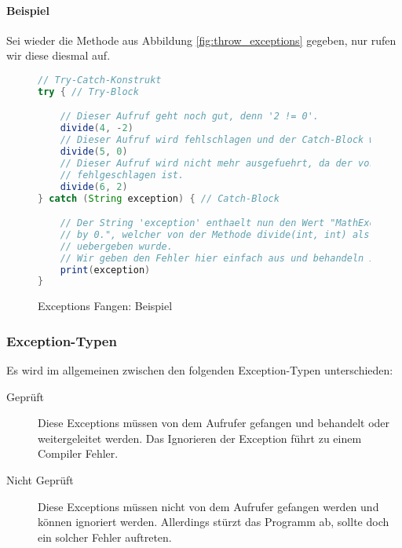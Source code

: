 		\paragraph{Beispiel}
			Sei wieder die Methode aus Abbildung \ref{fig:throw_exceptions} gegeben, nur rufen wir diese diesmal auf.
			\begin{figure}[H]
				\centering
				\begin{lstlisting}[language = Java, style = base]
// Try-Catch-Konstrukt
try { // Try-Block

	// Dieser Aufruf geht noch gut, denn '2 != 0'.
	divide(4, -2)
	// Dieser Aufruf wird fehlschlagen und der Catch-Block wird ausgefuehrt.
	divide(5, 0)
	// Dieser Aufruf wird nicht mehr ausgefuehrt, da der vorherige Aufruf
	// fehlgeschlagen ist.
	divide(6, 2)
} catch (String exception) { // Catch-Block

	// Der String 'exception' enthaelt nun den Wert "MathException: Cannot divide
	// by 0.", welcher von der Methode divide(int, int) als Fehlermeldung
	// uebergeben wurde.
	// Wir geben den Fehler hier einfach aus und behandeln ihn nicht weiter.
	print(exception)
}
				\end{lstlisting}
				\caption{Exceptions Fangen: Beispiel}
			\end{figure}
	
	\subsubsection{Exception-Typen}
		Es wird im allgemeinen zwischen den folgenden Exception-Typen unterschieden:
		\begin{description}
			\item[Geprüft] Diese Exceptions müssen von dem Aufrufer gefangen und behandelt oder weitergeleitet werden. Das Ignorieren der Exception führt zu einem Compiler Fehler.
			\item[Nicht Geprüft] Diese Exceptions müssen nicht von dem Aufrufer gefangen werden und können ignoriert werden. Allerdings stürzt das Programm ab, sollte doch ein solcher Fehler auftreten.
		\end{description}
		
